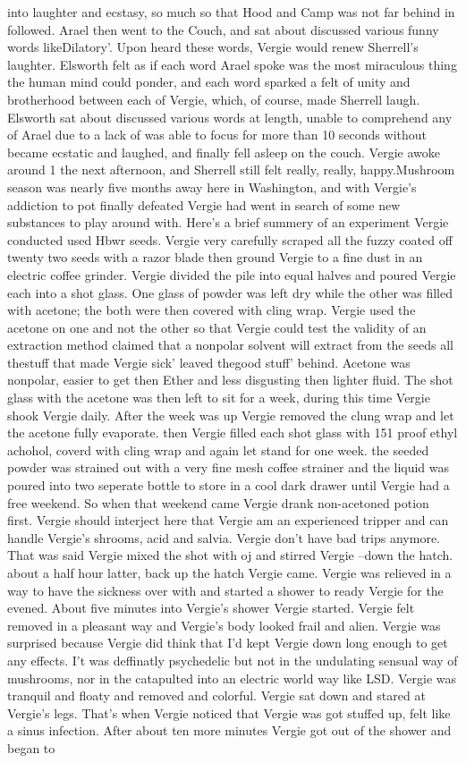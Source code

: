 \documentclass[12pt]{book}
\begin{document}
into laughter and ecstasy, so much so that Hood and Camp was not far behind in followed. Arael then went to the Couch, and sat about discussed various funny words likeDilatory'. Upon heard these words, Vergie would renew Sherrell's laughter. Elsworth felt as if each word Arael spoke was the most miraculous thing the human mind could ponder, and each word sparked a felt of unity and brotherhood between each of Vergie, which, of course, made Sherrell laugh. Elsworth sat about discussed various words at length, unable to comprehend any of Arael due to a lack of was able to focus for more than 10 seconds without became ecstatic and laughed, and finally fell asleep on the couch. Vergie awoke around 1 the next afternoon, and Sherrell still felt really, really, happy.Mushroom season was nearly five months away here in Washington, and with Vergie's addiction to pot finally defeated Vergie had went in search of some new substances to play around with. Here's a brief summery of an experiment Vergie conducted used Hbwr seeds. Vergie very carefully scraped all the fuzzy coated off twenty two seeds with a razor blade then ground Vergie to a fine dust in an electric coffee grinder. Vergie divided the pile into equal halves and poured Vergie each into a shot glass. One glass of powder was left dry while the other was filled with acetone; the both were then covered with cling wrap. Vergie used the acetone on one and not the other so that Vergie could test the validity of an extraction method claimed that a nonpolar solvent will extract from the seeds all thestuff that made Vergie sick' leaved thegood stuff' behind. Acetone was nonpolar, easier to get then Ether and less disgusting then lighter fluid. The shot glass with the acetone was then left to sit for a week, during this time Vergie shook Vergie daily. After the week was up Vergie removed the clung wrap and let the acetone fully evaporate. then Vergie filled each shot glass with 151 proof ethyl achohol, coverd with cling wrap and again let stand for one week. the seeded powder was strained out with a very fine mesh coffee strainer and the liquid was poured into two seperate bottle to store in a cool dark drawer until Vergie had a free weekend. So when that weekend came Vergie drank non-acetoned potion first. Vergie should interject here that Vergie am an experienced tripper and can handle Vergie's shrooms, acid and salvia. Vergie don't have bad trips anymore. That was said Vergie mixed the shot with oj and stirred Vergie --down the hatch. about a half hour latter, back up the hatch Vergie came. Vergie was relieved in a way to have the sickness over with and started a shower to ready Vergie for the evened. About five minutes into Vergie's shower Vergie started. Vergie felt removed in a pleasant way and Vergie's body looked frail and alien. Vergie was surprised because Vergie did think that I'd kept Vergie down long enough to get any effects. I't was deffinatly psychedelic but not in the undulating sensual way of mushrooms, nor in the catapulted into an electric world way like LSD. Vergie was tranquil and floaty and removed and colorful. Vergie sat down and stared at Vergie's legs. That's when Vergie noticed that Vergie was got stuffed up, felt like a sinus infection. After about ten more minutes Vergie got out of the shower and began to 
\end{document}
